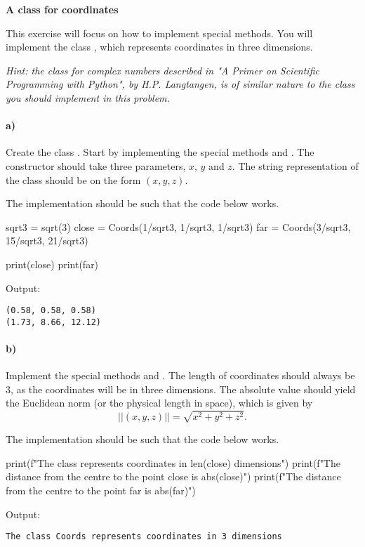\begin{Problem} {\textbf{A class for coordinates}}

\noindent
This exercise will focus on how to implement special methods. You will implement
the class , which represents coordinates in three dimensions.

\emph{Hint: the class for complex numbers described in "A Primer on Scientific
Programming with Python", by H.P. Langtangen, is of similar nature to the class
you should implement in this problem.}

\paragraph{a)} Create the class . Start by implementing the special methods  and .  The constructor
should take three parameters, $x$, $y$ and $z$. The string representation of the
class should be on the form $(x, y, z)$.

The implementation should be such that the code below works.
\begin{python}
sqrt3 = sqrt(3)
close = Coords(1/sqrt3, 1/sqrt3, 1/sqrt3)
far = Coords(3/sqrt3, 15/sqrt3, 21/sqrt3)

print(close)
print(far)
\end{python}
Output:
\begin{lstlisting}
(0.58, 0.58, 0.58)
(1.73, 8.66, 12.12)
\end{lstlisting}


\paragraph{b)} Implement the special methods 
and . The length of coordinates should always
be 3, as the coordinates will be in three dimensions. The absolute value
should yield the Euclidean norm (or the physical length in space), which
is given by
\begin{equation*}
    ||(x, y, z)||= \sqrt{x^2 + y^2 + z^2} .
\end{equation*}

The implementation should be such that the code below works.
\begin{python}
print(f"The class represents coordinates in {len(close)} dimensions")
print(f"The distance from the centre to the point close is {abs(close)}")
print(f"The distance from the centre to the point far is {abs(far)}")
\end{python}
Output:
\begin{lstlisting}
The class Coords represents coordinates in 3 dimensions


\end{lstlisting}
\end{Problem}
